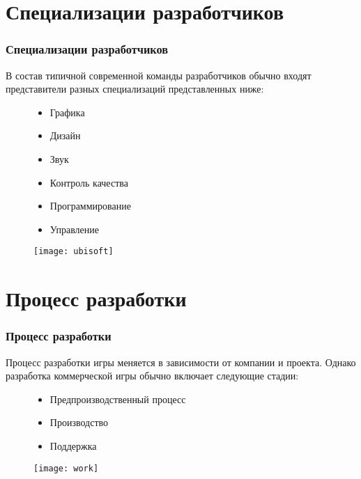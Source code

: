 \section{Специализации разработчиков}
\begin{frame}
    \frametitle{Специализации разработчиков}
    В состав типичной современной команды разработчиков обычно входят представители разных 
    специализаций представленных ниже:
    \begin{figure}
        \begin{minipage}{0.47\textwidth}
            \begin{itemize}
                \item Графика
                \item Дизайн
                \item Звук
                \item Контроль качества
                \item Программирование
                \item Управление
            \end{itemize}
        \end{minipage}
        \begin{minipage}{0.5\textwidth}
            \texttt{[image: ubisoft]}
        \end{minipage}
    \end{figure}
\end{frame}

\section{Процесс разработки}
\begin{frame}
    \frametitle{Процесс разработки}
    Процесс разработки игры меняется в зависимости от компании и проекта. Однако разработка 
    коммерческой игры обычно включает следующие стадии:
    \begin{figure}
        \begin{minipage}{0.47\textwidth}
            \begin{itemize}
                \item Предпроизводственный процесс
                \item Производство
                \item Поддержка
            \end{itemize}
        \end{minipage}
        \begin{minipage}{0.5\textwidth}
            \texttt{[image: work]}
        \end{minipage}
    \end{figure}
\end{frame}

